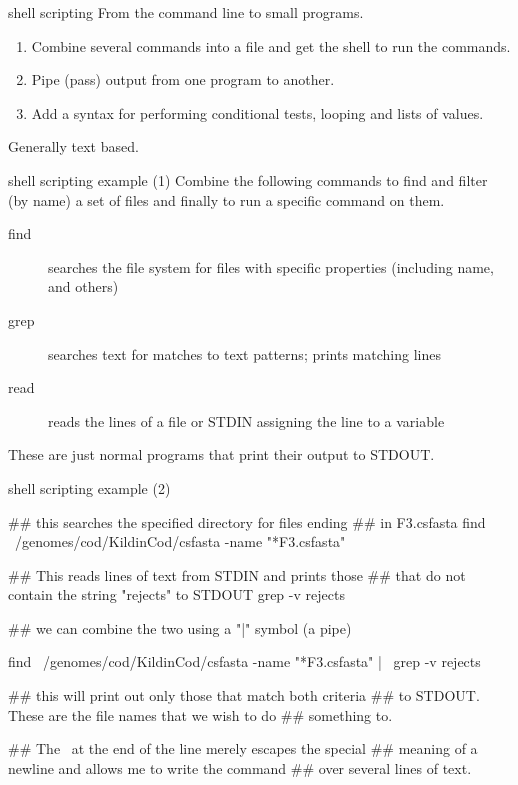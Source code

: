 \documentclass[pdf]{beamer}
\begin{document}
\begin{frame}{shell scripting}
  From the command line to small programs.

  \begin{enumerate}
  \item Combine several commands into a file and get the shell to run the
    commands.
  \item Pipe (pass) output from one program to another.
  \item Add a syntax for performing conditional tests, looping and lists of
    values.
  \end{enumerate}

  Generally text based.
\end{frame}

\begin{frame}[fragile]{shell scripting example (1)}
  Combine the following commands to find and filter (by name) a set of files
  and finally to run a specific command on them.
  
  \begin{description}
  \item[find] searches the file system for files with specific properties
    (including name, and others)
  \item[grep] searches text for matches to text patterns; prints matching
    lines
  \item[read] reads the lines of a file or STDIN assigning the line to a
    variable
  \end{description}

  These are just normal programs that print their output to STDOUT.
\end{frame}


\begin{frame}[fragile]{shell scripting example (2)}
  \begin{shcode}
    ## this searches the specified directory for files ending 
    ## in F3.csfasta
    find ~/genomes/cod/KildinCod/csfasta -name "*F3.csfasta"

    ## This reads lines of text from STDIN and prints those 
    ## that do not contain the string "rejects" to STDOUT
    grep -v rejects

    ## we can combine the two using a "|" symbol (a pipe)
    
    find ~/genomes/cod/KildinCod/csfasta -name "*F3.csfasta" | \
    grep -v rejects

    ## this will print out only those that match both criteria 
    ## to STDOUT. These are the file names that we wish to do 
    ## something to.
    
    ## The \ at the end of the line merely escapes the special 
    ## meaning of a newline and allows me to write the command 
    ## over several lines of text.
  \end{shcode}

\end{frame}
\end{document}
